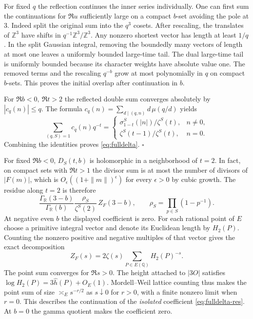\documentclass[11pt]{article}
\begin{document}
For fixed $q$ the reflection continues the inner series individually.
One can first sum the continuations for $\Re u$ sufficiently large on
a compact $b$-set avoiding the pole at $3$. Indeed split the original
sum into the $q^3$ cosets. After rescaling, the translates of
$\mathbb Z^3$ have shifts in $q^{-1}\mathbb Z^3/\mathbb Z^3$. Any
nonzero shortest vector has length at least $1/q$. In the split
Gaussian integral, removing the boundedly many vectors of length at
most one leaves a uniformly bounded large-time tail. The dual
large-time tail is uniformly bounded because its character weights
have absolute value one. The removed terms and the rescaling
$q^{-b}$ grow at most polynomially in $q$ on compact $b$-sets.
This proves the initial overlap after continuation in $b$.

For $\Re b<0,\ \Re t>2$ the reflected double sum converges absolutely
by $|c_q(n)|\le q$. The formula
$c_q(n)=\sum_{d\mid(q,n)}d\,\mu(q/d)$ yields
\[
 \sum_{(q,S)=1} c_q(n)q^{-t}=
 \begin{cases}
 \sigma_{1-t}^S(|n|)/\zeta^S(t), &n\ne0,\\
 \zeta^S(t-1)/\zeta^S(t), &n=0 .
 \end{cases}
\]
Combining the identities proves \eqref{eq:fulldelta}.
\hfill$\square$

\medskip
For fixed $\Re b<0$, $D_S(t,b)$ is holomorphic in a neighborhood of
$t=2$. In fact, on compact sets with $\Re t>1$ the divisor sum is at
most the number of divisors of $|F(m)|$, which is
$O_\epsilon((1+\|m\|)^\epsilon)$ for every $\epsilon>0$ by cubic growth.
The residue along $t=2$ is therefore
\begin{equation}\label{eq:fulldelta-res}
 \frac{\Gamma_{\mathbb R}(3-b)}{\Gamma_{\mathbb R}(b)}
 \frac{\rho_S}{\zeta^S(2)}\, Z_F(3-b),
 \qquad \rho_S=\prod_{p\in S}(1-p^{-1}).
\end{equation}
At negative even $b$ the displayed coefficient is zero. For each
rational point of $E$ choose a primitive integral vector and denote its
Euclidean length by $H_2(P)$. Counting the nonzero positive and negative
multiples of that vector gives the exact decomposition
\[
 Z_F(s)=2\zeta(s)\sum_{P\in E(\mathbb Q)} H_2(P)^{-s}.
\]
The point sum converges for $\Re s>0$. The height attached to
$|3O|$ satisfies $\log H_2(P)=3\hat h(P)+O_E(1)$. Mordell--Weil lattice
counting thus makes the point sum of size $\asymp_E s^{-r/2}$ as
$s\downarrow0$ for $r>0$, with a finite nonzero limit when $r=0$.
This describes the continuation of the \emph{isolated} coefficient
\eqref{eq:fulldelta-res}. At $b=0$ the gamma quotient makes the
coefficient zero.
\end{document}
